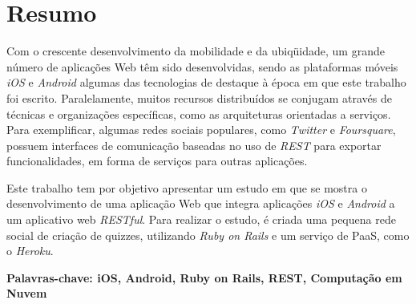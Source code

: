 \chapter*{Resumo}
\label{chp:resumo}%
\thispagestyle{empty}

\setcounter{footnote}{0}

Com o crescente desenvolvimento da mobilidade e da ubiqüidade, um grande número de aplicações Web têm sido desenvolvidas, sendo as plataformas móveis \emph{iOS} e \emph{Android} algumas das tecnologias de destaque à época em que este trabalho foi escrito. Paralelamente, muitos recursos distribuídos se conjugam através de técnicas e organizações específicas, como as arquiteturas orientadas a serviços. Para exemplificar, algumas redes sociais populares, como \emph{Twitter} e \emph{Foursquare}, possuem interfaces de comunicação baseadas no uso de \emph{REST} para exportar funcionalidades, em forma de serviços para outras aplicações. 

Este trabalho tem por objetivo apresentar um estudo em que se mostra o desenvolvimento de uma aplicação Web que integra aplicações \emph{iOS} e \emph{Android} a um aplicativo web \emph{RESTful}. Para realizar o estudo, é criada uma pequena rede social de criação de quizzes, utilizando \emph{Ruby on Rails} e um serviço de PaaS, como o \emph{Heroku}.


\noindent \textbf{Palavras-chave: iOS, Android, Ruby on Rails, REST, Computação em Nuvem}